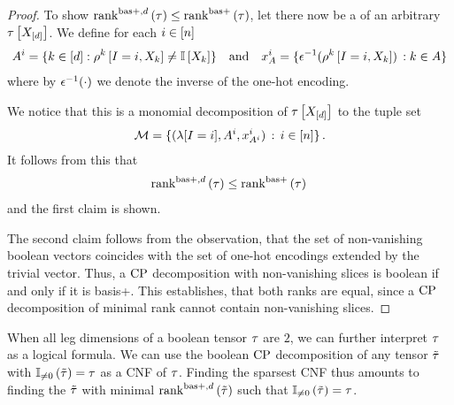\begin{proof}
    To show $\mathrm{rank}^{\mathrm{bas+},d}\left(\tau\right) \leq \mathrm{rank}^{\mathrm{bas+}}\left(\tau\right)$, let there now be a \basplusDecomposition{} of an arbitrary $\tau\left[X_{[d]}\right]$.
    We define for each $i\in[n]$
    \begin{align*}
        A^{i} = \{k\in[d] : \rho^{k}\left[I=i, X_{k}\right] \neq \mathbb{I}\left[X_{k}\right] \}
        \quad \text{and} \quad
        x_{A}^{i} = \{\epsilon^{-1}(\rho^{k}\left[I=i, X_{k}\right] ) \, : k\in A\}
    \end{align*}
    where by $\epsilon^{-1}(\cdot)$ we denote the inverse of the one-hot encoding.

    We notice that this is a monomial decomposition of $\tau\left[X_{[d]}\right]$ to the tuple set
    \begin{align*}
        \mathcal{M} = \{(\lambda[I=i], A^{i}, x_{A^{i}}^{i} ) \,:\, i\in[n] \} \, .
    \end{align*}
    It follows from this that
    \begin{align*}
        \mathrm{rank}^{\mathrm{bas+},d}\left(\tau\right) \leq \mathrm{rank}^{\mathrm{bas+}}\left(\tau\right) \,
    \end{align*}
    and the first claim is shown.

    The second claim follows from the observation, that the set of non-vanishing boolean vectors coincides with the set of one-hot encodings extended by the trivial vector.
    Thus, a $\mathrm{CP}$ decomposition with non-vanishing slices is boolean if and only if it is basis+.
    This establishes, that both ranks are equal, since a $\mathrm{CP}$ decomposition of minimal rank cannot contain non-vanishing slices.
\end{proof}

\begin{remark}
    When all leg dimensions of a boolean tensor $\tau$ are $2$, we can further interpret $\tau$ as a logical formula.
    We can use the boolean $\mathrm{CP}$ decomposition of any tensor $\tilde{\tau}$ with $\mathbb{I}_{\neq0}\left(\tilde{\tau}\right)=\tau$ as a CNF of $\tau$.
    Finding the sparsest CNF thus amounts to finding the $\tilde{\tau}$ with minimal $\mathrm{rank}^{\mathrm{bas+},d}\left(\tilde{\tau}\right)$ such that $\mathbb{I}_{\neq0}\left(\tilde{\tau}\right)=\tau$.
\end{remark}

